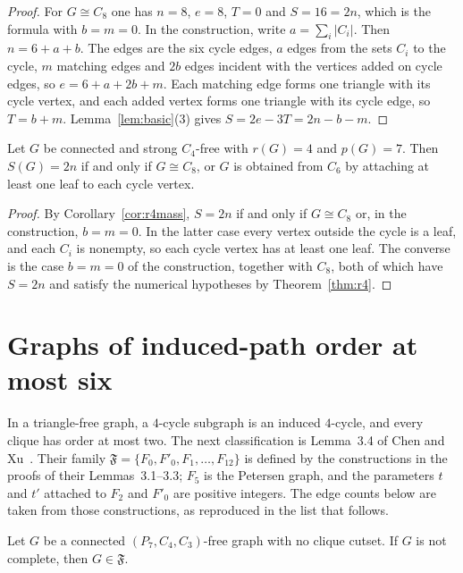 \documentclass[ASNA]{USG}
\theoremstyle{WBstyletwo}
\numberwithin{equation}{section}
\newcommand{\pp}{p}
\begin{document}
\begin{proof}
For $G\cong C_8$ one has $n=8$, $e=8$, $T=0$ and $S=16=2n$, which is the formula with $b=m=0$. In the construction, write $a=\sum_i|C_i|$. Then $n=6+a+b$. The edges are the six cycle edges, $a$ edges from the sets $C_i$ to the cycle, $m$ matching edges and $2b$ edges incident with the vertices added on cycle edges, so $e=6+a+2b+m$. Each matching edge forms one triangle with its cycle vertex, and each added vertex forms one triangle with its cycle edge, so $T=b+m$. Lemma~\ref{lem:basic}(3) gives $S=2e-3T=2n-b-m$.
\end{proof}

\begin{corollary}\label{cor:r4eq}
Let $G$ be connected and strong $C_4$-free with $r(G)=4$ and $\pp(G)=7$. Then $S(G)=2n$ if and only if $G\cong C_8$, or $G$ is obtained from $C_6$ by attaching at least one leaf to each cycle vertex.
\end{corollary}

\begin{proof}
By Corollary~\ref{cor:r4mass}, $S=2n$ if and only if $G\cong C_8$ or, in the construction, $b=m=0$. In the latter case every vertex outside the cycle is a leaf, and each $C_i$ is nonempty, so each cycle vertex has at least one leaf. The converse is the case $b=m=0$ of the construction, together with $C_8$, both of which have $S=2n$ and satisfy the numerical hypotheses by Theorem~\ref{thm:r4}.
\end{proof}

\section{Graphs of induced-path order at most six}\label{sec:tf}

In a triangle-free graph, a $4$-cycle subgraph is an induced $4$-cycle, and every clique has order at most two. The next classification is Lemma~3.4 of Chen and Xu~\cite{chenxu}. Their family $\mathfrak F=\{F_0,F'_0,F_1,\dots,F_{12}\}$ is defined by the constructions in the proofs of their Lemmas~3.1--3.3; $F_5$ is the Petersen graph, and the parameters $t$ and $t'$ attached to $F_2$ and $F'_0$ are positive integers. The edge counts below are taken from those constructions, as reproduced in the list that follows.

\begin{lemma}\label{lem:chenxu}
Let $G$ be a connected $(P_7,C_4,C_3)$-free graph with no clique cutset. If $G$ is not complete, then $G\in\mathfrak F$.
\end{lemma}
\end{document}

